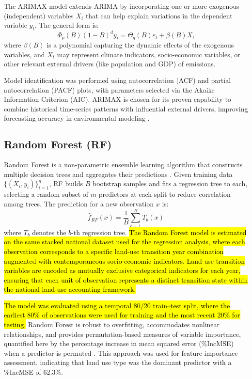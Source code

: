\documentclass[10pt,letterpaper]{article}
\begin{document}
The ARIMAX model extends ARIMA by incorporating one or more exogenous (independent) variables \( X_t \) that can help explain variations in the dependent variable \( y_t \). The general form is:
\begin{equation}
\Phi_p(B)(1 - B)^d y_t = \Theta_q(B) \varepsilon_t + \beta(B) X_t
\end{equation}
where \( \beta(B) \) is a polynomial capturing the dynamic effects of the exogenous variables, and \( X_t \) may represent climate indicators, socio-economic variables, or other relevant external drivers (like population and GDP) of emissions. 

Model identification was performed using autocorrelation (ACF) and partial autocorrelation (PACF) plots, with parameters selected via the Akaike Information Criterion (AIC). ARIMAX is chosen for its proven capability to combine historical time-series patterns with influential external drivers, improving forecasting accuracy in environmental modeling \cite{majka2024arimax}.



\subsection{Random Forest (RF)}

Random Forest is a non-parametric ensemble learning algorithm that constructs multiple decision trees and aggregates their predictions \cite{syam2021random, guhan2024emlarde}. Given training data \(\{(X_i, y_i)\}_{i=1}^n\), RF builds \(B\) bootstrap samples and fits a regression tree to each, selecting a random subset of \(m\) predictors at each split to reduce correlation among trees. The prediction for a new observation \(x\) is:
\begin{equation}
	\hat{f}_{RF}(x) = \frac{1}{B} \sum_{b=1}^B T_b(x)
\end{equation}
where \(T_b\) denotes the \(b\)-th regression tree.
\hl{The Random Forest model is estimated on the same stacked national dataset used for the regression analysis, where each observation corresponds to a specific land-use transition year combination augmented with contemporaneous socio-economic indicators. Land-use transition variables are encoded as mutually exclusive categorical indicators for each year, ensuring that each unit of observation represents a distinct transition state within the national land-use accounting framework.}

\hl{The model was evaluated using a temporal 80/20 train–test split, where the earliest 80\% of observations were used for training and the most recent 20\% for testing.} Random Forest is robust to overfitting, accommodates nonlinear relationships, and provides permutation-based measures of variable importance, quantified here by the percentage increase in mean squared error (\%IncMSE) when a predictor is permuted \cite{zhou2023comparative}. This approach was used for feature importance assessment, indicating that land use type was the dominant predictor with a \%IncMSE of 62.3\%.
\end{document}
